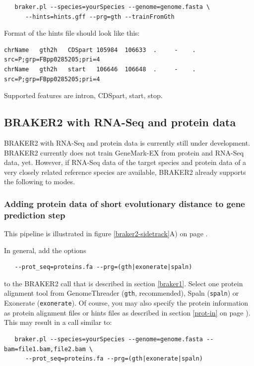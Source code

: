 \documentclass[a4paper,10pt]{report}
\begin{document}
\begin{verbatim}
   braker.pl --species=yourSpecies --genome=genome.fasta \
      --hints=hints.gff --prg=gth --trainFromGth
\end{verbatim}

Format of the hints file should look like this:

\begin{verbatim}
chrName   gth2h   CDSpart 105984  106633  .     -    .    src=P;grp=FBpp0285205;pri=4
chrName   gth2h   start   106646  106648  .     -    .    src=P;grp=FBpp0285205;pri=4
\end{verbatim}

Supported features are intron, CDSpart, start, stop.

\subsection{BRAKER2 with RNA-Seq and protein data}

BRAKER2 with RNA-Seq and protein data is currently still under development. BRAKER2 currently does not train GeneMark-EX from protein and RNA-Seq data, yet. However, if RNA-Seq data of the target species and protein data of a very closely related reference species are available, BRAKER2 already supports the following to modes.

\subsubsection{Adding protein data of short evolutionary distance to gene prediction step}

This pipeline is illustrated in figure \ref{braker2-sidetrack}A) on page \pageref{braker2-sidetrack}.

In general, add the options

\begin{verbatim}
   --prot_seq=proteins.fa --prg=(gth|exonerate|spaln)
\end{verbatim}

to the BRAKER2 call that is described in section \ref{braker1}. Select one protein alignment tool from GenomeThreader (\texttt{gth}, recommended), Spaln (\texttt{spaln}) or Exonerate (\texttt{exonerate}). Of course, you may also specify the protein information as protein alignment files or hints files as described in section \ref{prot-in} on page \pageref{prot-in}). This may result in a call similar to:

\begin{verbatim}
   braker.pl --species=yourSpecies --genome=genome.fasta --bam=file1.bam,file2.bam \
      --prot_seq=proteins.fa --prg=(gth|exonerate|spaln)
\end{verbatim}
\end{document}

